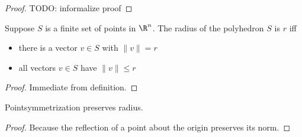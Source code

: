 \begin{proof}
\leanok
TODO: informalize proof
\end{proof}


\begin{theorem}
\label{thm:polyhedron_radius_iff}
\leanok
Suppose $S$ is a finite set of points in $\R^n$.
The radius of the polyhedron $S$ is $r$ iff
\begin{itemize}
\item there is a vector $v \in S$ with $\|v\| = r$
\item all vectors $v \in S$ have $\|v\| \le r$
\end{itemize}
\end{theorem}
\begin{proof}
\leanok
Immediate from definition.
\end{proof}


\begin{theorem}
\label{thm:pointsymmetrize_pres_radius}
\leanok
Pointsymmetrization preserves radius.
\end{theorem}
\begin{proof}
\leanok
Because the reflection of a point about the origin preserves its norm.
\end{proof}

